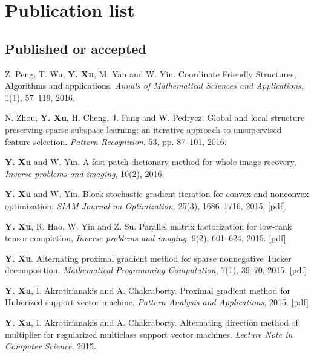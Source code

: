 \documentclass[letterpaper]{article}
\begin{document}
\section*{Publication list}

\subsection*{Published or accepted}

\begin{etaremune}\setlength{\itemsep}{-1.5pt}
\item Z. Peng, T. Wu, \textbf{Y. Xu}, M. Yan and W. Yin. Coordinate Friendly Structures, Algorithms and applications. \emph{Annals of Mathematical Sciences and Applications}, 1(1), 57--119, 2016.
\item N. Zhou, \textbf{Y. Xu}, H. Cheng, J. Fang and W. Pedrycz. Global and local structure preserving sparse subspace learning: an iterative approach to unsupervised feature selection. \emph{Pattern Recognition}, 53, pp. 87--101, 2016.
\item \textbf{Y. Xu} and W. Yin. A fast patch-dictionary method for whole image recovery, \emph{Inverse problems and imaging}, 10(2), 2016.
\item \textbf{Y. Xu} and W. Yin. Block stochastic gradient iteration for convex and nonconvex optimization, \emph{SIAM Journal on Optimization}, 25(3), 1686--1716, 2015. \href{http://www.ima.umn.edu/~yangyang/papers/BSG.pdf}{[pdf]}
\item \textbf{Y. Xu}, R. Hao, W. Yin and Z. Su. Parallel matrix factorization for low-rank tensor completion, \emph{Inverse problems and imaging}, 9(2), 601--624, 2015. \href{http://aimsciences.org/journals/pdfs.jsp?paperID=10942&mode=full}{[pdf]}
\item \textbf{Y. Xu}. Alternating proximal gradient method for sparse nonnegative Tucker decomposition. \emph{Mathematical Programming Computation}, 7(1), 39--70, 2015. \href{http://link.springer.com/article/10.1007/s12532-014-0074-y}{[pdf]}
\item \textbf{Y. Xu}, I. Akrotirianakis and A. Chakraborty. Proximal gradient method for Huberized support vector machine, \emph{Pattern Analysis and Applications}, 2015. \href{http://link.springer.com/article/10.1007/s10044-015-0485-z}{[pdf]}
\item \textbf{Y. Xu}, I. Akrotirianakis and A. Chakraborty. Alternating direction method of multiplier for regularized multiclass support vector machines. \emph{Lecture Note in Computer Science}, 2015.

\end{etaremune}
\end{document}
